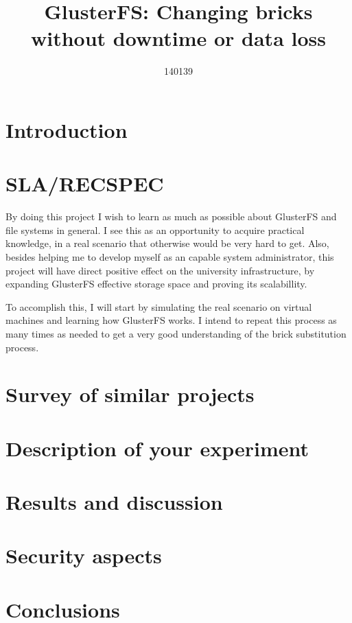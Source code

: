 

\title{GlusterFS: Changing bricks without downtime or data loss}
\author{140139}



\maketitle


\thispagestyle{empty}

\clearpage
{}
\setcounter{page}{1}
\tableofcontents

\clearpage
{}

\section{Introduction}


\section{SLA/RECSPEC}

By doing this project I wish to learn as much as possible about GlusterFS and file systems in general. I see this as an opportunity to acquire practical knowledge, in a real scenario that otherwise would be very hard to get. Also, besides helping me to develop myself as an capable system administrator, this project will have direct positive effect on the university infrastructure, by expanding GlusterFS effective storage space and proving its scalabillity.

To accomplish this, I will start by simulating the real scenario on virtual machines and learning how GlusterFS works. I intend to repeat this process as many times as needed to get a very good understanding of the brick substitution process.


\section{Survey of similar projects}


\section{Description of your experiment}


\section{Results and discussion}


\section{Security aspects}


\section{Conclusions}






